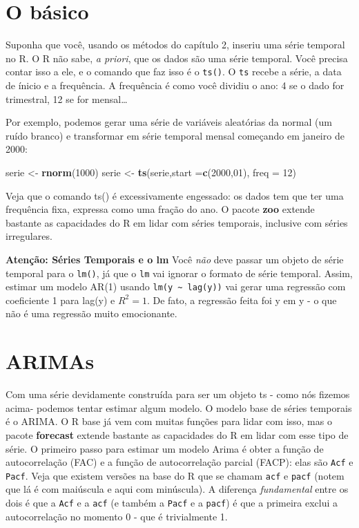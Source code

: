 \documentclass[]{book}
\newenvironment{Shaded}{\begin{snugshade}}{\end{snugshade}}
\newcommand{\KeywordTok}[1]{\textcolor[rgb]{0.13,0.29,0.53}{\textbf{#1}}}
\newcommand{\DataTypeTok}[1]{\textcolor[rgb]{0.13,0.29,0.53}{#1}}
\newcommand{\DecValTok}[1]{\textcolor[rgb]{0.00,0.00,0.81}{#1}}
\newcommand{\StringTok}[1]{\textcolor[rgb]{0.31,0.60,0.02}{#1}}
\newcommand{\NormalTok}[1]{#1}
\begin{document}
\section{O básico}\label{o-basico}

Suponha que você, usando os métodos do capítulo 2, inseriu uma série
temporal no R. O R não sabe, \emph{a priori}, que os dados são uma série
temporal. Você precisa contar isso a ele, e o comando que faz isso é o
\texttt{ts()}. O \texttt{ts} recebe a série, a data de ínicio e a
frequência. A frequência é como você dividiu o ano: 4 se o dado for
trimestral, 12 se for mensal\ldots{}

Por exemplo, podemos gerar uma série de variáveis aleatórias da normal
(um ruído branco) e transformar em série temporal mensal começando em
janeiro de 2000:

\begin{Shaded}
\begin{Highlighting}[]
\NormalTok{serie <-}\StringTok{ }\KeywordTok{rnorm}\NormalTok{(}\DecValTok{1000}\NormalTok{)}
\NormalTok{serie <-}\StringTok{ }\KeywordTok{ts}\NormalTok{(serie,}\DataTypeTok{start =}\KeywordTok{c}\NormalTok{(}\DecValTok{2000}\NormalTok{,}\DecValTok{01}\NormalTok{), }\DataTypeTok{freq =} \DecValTok{12}\NormalTok{)}
\end{Highlighting}
\end{Shaded}

Veja que o comando ts() é excessivamente engessado: os dados tem que ter
uma frequência fixa, expressa como uma fração do ano. O pacote
\textbf{zoo} extende bastante as capacidades do R em lidar com séries
temporais, inclusive com séries irregulares.

\textbf{Atenção: Séries Temporais e o lm} Você \emph{não} deve passar um
objeto de série temporal para o \texttt{lm()}, já que o \texttt{lm} vai
ignorar o formato de série temporal. Assim, estimar um modelo AR(1)
usando \texttt{lm(y\ \textasciitilde{}\ lag(y))} vai gerar uma regressão
com coeficiente 1 para lag(y) e \(R^2 = 1\). De fato, a regressão feita
foi y em y - o que não é uma regressão muito emocionante.

\section{ARIMAs}\label{arimas}

Com uma série devidamente construída para ser um objeto ts - como nós
fizemos acima- podemos tentar estimar algum modelo. O modelo base de
séries temporais é o ARIMA. O R base já vem com muitas funções para
lidar com isso, mas o pacote \textbf{forecast} extende bastante as
capacidades do R em lidar com esse tipo de série. O primeiro passo para
estimar um modelo Arima é obter a função de autocorrelação (FAC) e a
função de autocorrelação parcial (FACP): elas são \texttt{Acf} e
\texttt{Pacf}. Veja que existem versões na base do R que se chamam
\texttt{acf} e \texttt{pacf} (notem que lá é com maiúscula e aqui com
minúscula). A diferença \emph{fundamental} entre os dois é que a
\texttt{Acf} e a \texttt{acf} (e também a \texttt{Pacf} e a
\texttt{pacf}) é que a primeira exclui a autocorrelação no momento 0 -
que é trivialmente 1.
\end{document}
